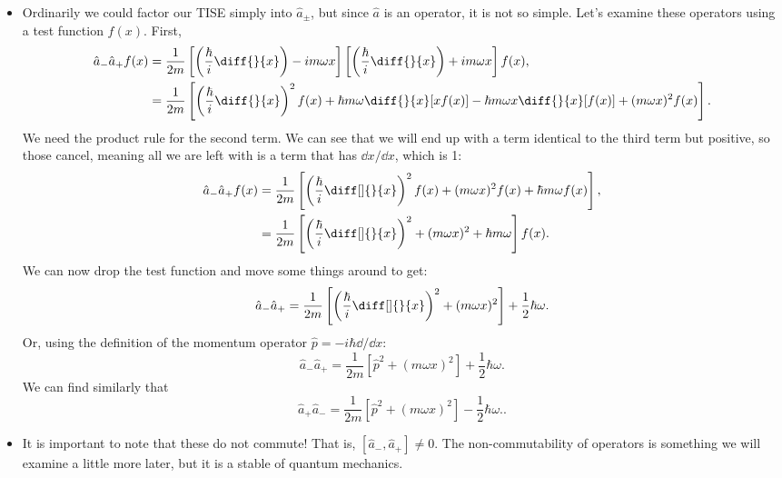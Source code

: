 \begin{itemize}
    \item Ordinarily we could factor our TISE simply into $\hat{a}_{\pm}$, but since $\hat{a}$ is an operator, it is not so simple. Let's examine these operators using a test function $f(x)$. First,
        \begin{align*}
            \hat{a}_-\hat{a}_+ f(x) &= \frac{1}{2m}\left[ \left( \frac{\hbar}{i}\diff{}{x} \right) - im\omega x \right]\left[ \left( \frac{\hbar}{i}\diff{}{x} \right) + im\omega x \right]f(x), \\
            &= \frac{1}{2m} \left[ \left( \frac{\hbar}{i}\diff{}{x} \right)^2f(x) + \hbar m \omega \diff{}{x}[xf(x)] -\hbar m\omega x\diff{}{x}[f(x)] + (m\omega x)^2 f(x) \right].
        \end{align*}
        We need the product rule for the second term. We can see that we will end up with a term identical to the third term but positive, so those cancel, meaning all we are left with is a term that has $\dd x/\dd x$, which is 1:
        \begin{align*}
            \hat{a}_-\hat{a}_+ f(x) &= \frac{1}{2m} \left[ \left( \frac{\hbar}{i}\diff[]{}{x} \right)^2f(x) + (m\omega x)^2f(x) + \hbar m\omega f(x) \right], \\
            &= \frac{1}{2m} \left[ \left( \frac{\hbar}{i}\diff[]{}{x} \right)^2 + (m\omega x)^2 + \hbar m\omega \right]f(x).
        \end{align*}
        We can now drop the test function and move some things around to get:
        \begin{equation*}
            \hat{a}_-\hat{a}_+ = \frac{1}{2m} \left[ \left( \frac{\hbar}{i}\diff[]{}{x} \right)^2 + (m\omega x)^2 \right] + \frac{1}{2}\hbar\omega.
        \end{equation*}
        Or, using the definition of the momentum operator $\hat{p} = -i\hbar \dd/\dd x$:
        \begin{equation}
            \hat{a}_-\hat{a}_+ = \frac{1}{2m} \left[ \hat{p}^2 + (m\omega x)^2 \right] + \frac{1}{2}\hbar\omega.\label{LadderAminusAplus}
        \end{equation}
        We can find similarly that
        \begin{equation}
            \hat{a}_+\hat{a}_- = \frac{1}{2m} \left[ \hat{p}^2 + (m\omega x)^2 \right] - \frac{1}{2}\hbar\omega.\label{LadderAPlusAminus}.
        \end{equation}
    \item It is important to note that these do not commute! That is, $[\hat{a}_-,\hat{a}_+] \neq 0$. The non-commutability of operators is something we will examine a little more later, but it is a stable of quantum mechanics.

\end{itemize}
